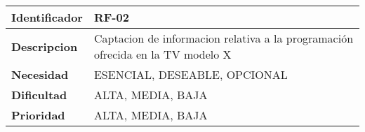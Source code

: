 \begin{center}
    \begin{tabular}{|p{2.6cm}|p{12cm}|}
    \hline
    \textbf{Identificador} & RF-02\\
    \hline
    \textbf{Descripcion} & Captacion de informacion relativa a la programación ofrecida en la TV modelo X\\
    \hline
    \textbf{Necesidad} & ESENCIAL, DESEABLE, OPCIONAL\\
    \hline
    \textbf{Dificultad} & ALTA, MEDIA, BAJA\\
    \hline
    \textbf{Prioridad} & ALTA, MEDIA, BAJA\\
    \hline
    \end{tabular}
\end{center}
